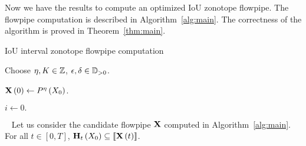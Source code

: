 Now we have the results to compute an optimized IoU zonotope flowpipe.
The flowpipe computation is described in Algorithm~\ref{alg:main}.
The correctness of the algorithm is proved in Theorem~\ref{thm:main}.
%
\begin{algorithm}\caption{IoU interval zonotope
flowpipe computation}\label{alg:main}


Choose $\eta,K\in\mathbb{Z}$, $\epsilon,\delta\in\mathbb{D}_{>0}$.

$\mathbf{X}\left(0\right)\gets P^{\eta}\left(X_0\right)$.

$i\gets 0.$

\end{algorithm}
%
\begin{theorem}~\label{thm:main}
Let us consider the candidate flowpipe $\mathbf{X}$ computed in
Algorithm~\ref{alg:main}.  For all $t\in[0,T]$,
$\mathbf{H}_{t}\left(X_0\right)\subseteq \left\llbracket{\mathbf{X}\left(t\right)}\right\rrbracket$.
\end{theorem}
%
